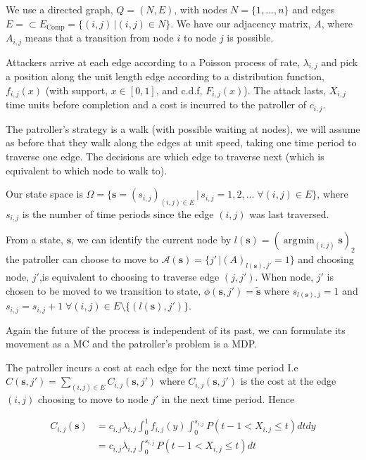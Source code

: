 \documentclass[a4paper,10pt]{article}
\DeclareMathOperator*{\argmin}{\arg\!\min}
\theoremstyle{definition}
\theoremstyle{definition}
\theoremstyle{remark}
\theoremstyle{definition}
\begin{document}
We use a directed graph, $Q=(N,E)$, with nodes $N=\{1,...,n \}$ and edges $E= \subset E_{\text{Comp}}= \{(i,j) \, | (i,j) \in N  \}$. We have our adjacency matrix, $A$, where $A_{i,j}$ means that a transition from node $i$ to node $j$ is possible.

Attackers arrive at each edge according to a Poisson process of rate, $\lambda_{i,j}$ and pick a position along the unit length edge according to a distribution function, $f_{i,j}(x)$ (with support, $x \in [0,1]$, and c.d.f, $F_{i,j}(x)$). The attack lasts, $X_{i,j}$ time units before completion and a cost is incurred to the patroller of $c_{i,j}$.

The patroller's strategy is a walk (with possible waiting at nodes), we will assume as before that they walk along the edges at unit speed, taking one time period to traverse one edge. The decisions are which edge to traverse next (which is equivalent to which node to walk to).

Our state space is $\Omega= \{ \bm{s}=(s_{i,j})_{(i,j) \in E} \, | \, s_{i,j}=1,2,... \; \forall (i,j) \in E \}$, where $s_{i,j}$ is the number of time periods since the edge $(i,j)$ was last traversed.

From a state, $\bm{s}$, we can identify the current node by $l(\bm{s}) = (\argmin_{(i,j)} \bm{s})_{2} $ the patroller can choose to move to $\mathcal{A}(\bm{s})= \{ j' \, | (A)_{l(\bm{s}),j'}=1 \}$  and choosing node, $j'$,is equivalent to choosing to traverse edge $(j,j')$. When node, $j'$ is chosen to be moved to we transition to state, $\phi(\bm{s},j')=\widetilde{\bm{s}}$ where $s_{l(\bm{s}),j}=1$ and $s_{i,j}=s_{i,j}+1 \; \forall (i,j) \in E \setminus \{(l(\bm{s}),j') \}$. 

Again the future of the process is independent of its past, we can formulate its  movement as a MC and the patroller's problem is a MDP.

The patroller incurs a cost at each edge for the next time period I.e $C(\bm{s},j')=\sum\limits_{(i,j) \in E} C_{i,j}(\bm{s},j')$ where $C_{i,j}(\bm{s},j')$ is the cost at the edge $(i,j)$ choosing to move to node $j'$ in the next time period. Hence

\begin{align*}
C_{i,j}(\bm{s})&= c_{i,j} \lambda_{i,j} \int_{0}^{1} f_{i,j}(y) \int_{0}^{s_{i,j}} P(t-1 < X_{i,j} \leq t) dt dy \\
&= c_{i,j} \lambda_{i,j} \int_{0}^{s_{i,j}} P(t-1 < X_{i,j} \leq t) dt \\
\end{align*}
\end{document}
